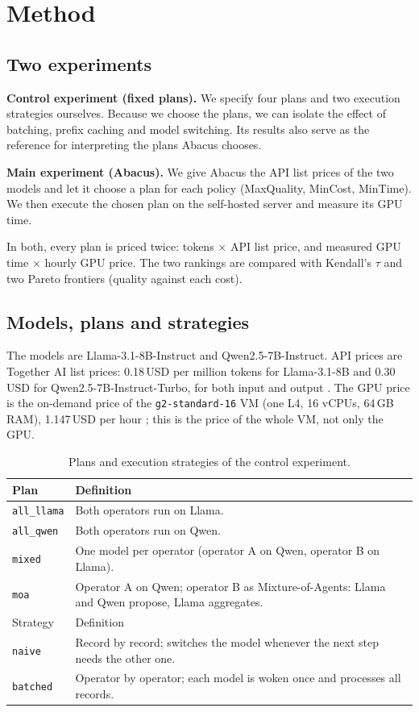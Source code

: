 \documentclass[11pt,a4paper]{article}
\newcommand{\code}[1]{\texttt{#1}}
\begin{document}
\section{Method}\label{sec:method}

\subsection{Two experiments}

\textbf{Control experiment (fixed plans).} We specify four plans and two execution strategies
ourselves. Because we choose the plans, we can isolate the effect of batching, prefix caching and
model switching. Its results also serve as the reference for interpreting the plans Abacus chooses.

\textbf{Main experiment (Abacus).} We give Abacus the API list prices of the two models and let it
choose a plan for each policy (MaxQuality, MinCost, MinTime). We then execute the chosen plan on the
self-hosted server and measure its GPU time.

In both, every plan is priced twice: tokens $\times$ API list price, and measured GPU time $\times$
hourly GPU price. The two rankings are compared with Kendall's $\tau$ and two Pareto frontiers
(quality against each cost).

\subsection{Models, plans and strategies}

The models are Llama-3.1-8B-Instruct and Qwen2.5-7B-Instruct. API prices are Together AI list
prices: 0.18\,USD per million tokens for Llama-3.1-8B and 0.30\,USD for Qwen2.5-7B-Instruct-Turbo, for both
input and output \cite{togetherllama,togetherqwen}. The GPU price is the on-demand price of the
\code{g2-standard-16} VM (one L4, 16 vCPUs, 64\,GB RAM), 1.147\,USD per hour
\cite{gcppricing}; this is the price of the whole VM, not only the GPU.

\begin{table}[h]
\centering\small
\begin{tabularx}{\linewidth}{@{}lX@{}}
\toprule
Plan & Definition \\
\midrule
\code{all\_llama} & Both operators run on Llama. \\
\code{all\_qwen} & Both operators run on Qwen. \\
\code{mixed} & One model per operator (operator A on Qwen, operator B on Llama). \\
\code{moa} & Operator A on Qwen; operator B as Mixture-of-Agents: Llama and Qwen propose, Llama aggregates. \\
\midrule
Strategy & Definition \\
\midrule
\code{naive} & Record by record; switches the model whenever the next step needs the other one. \\
\code{batched} & Operator by operator; each model is woken once and processes all records. \\
\bottomrule
\end{tabularx}
\caption{Plans and execution strategies of the control experiment.}
\end{table}
\end{document}
